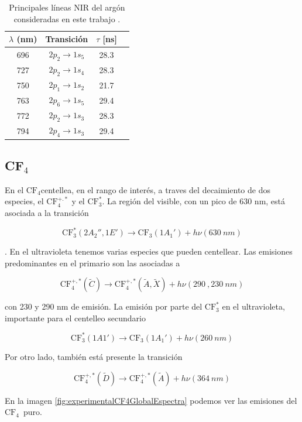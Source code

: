 \documentclass[12pt,a4paper]{article}
\newcommand{\CF}{\mathrm{CF}}
\DeclareRobustCommand{\CFt}{\ensuremath{\mathrm{CF}_4}}
\begin{document}
\begin{table}[htbp]
    \centering
    \caption{Principales líneas NIR del argón consideradas en este trabajo \cite{Wiese1989Argon}.}
    \label{tab:ArNIRlines}
    \begin{tabular}{cccc}
        \toprule
        $\lambda$ (nm) & Transición & $\tau$ [ns] \\
        \midrule
        696 & $2p_2 \rightarrow 1s_5$ & 28.3 \\
        727 & $2p_2 \rightarrow 1s_4$ & 28.3 \\
        750 & $2p_1 \rightarrow 1s_2$ & 21.7 \\
        763 & $2p_6 \rightarrow 1s_5$ & 29.4 \\
        772 & $2p_2 \rightarrow 1s_3$ & 28.3 \\
        794 & $2p_4 \rightarrow 1s_3$ & 29.4 \\
        \bottomrule
    \end{tabular}
\end{table}


\subsection{CF$_4$}

En el \CFt centellea, en el rango de interés, a traves del decaimiento de dos especies, el $\CF_4^{+.*}$ y el $\CF_3^*$. La región del visible, con un pico de 630 nm, está asociada a la transición 

$$\CF_3^*(2A_2'',1E') \rightarrow \CF_3(1A_1') + h \nu (\SI{630}{nm})$$ 

\cite{washida1983emission}. En el ultravioleta tenemos varias especies que pueden centellear. Las emisiones predominantes en el primario son las asociadas a 

$$\CF_4^{+,*} (\tilde{C}) \rightarrow  \CF_4^{+,*} (\tilde{A},\tilde{X})+ h \nu (\SI{290}{},\SI{230}{nm})$$ 

con 230 y 290 nm de emisión. La emisión por parte del $\CF_3^*$ en el ultravioleta, importante para el centelleo secundario

$$\CF_3^*(1A1') \rightarrow \CF_3(1A_1') + h \nu (\SI{260}{nm})$$ 

Por otro lado, también está presente la transición 

$$\CF_4^{+,*} (\tilde{D}) \rightarrow  \CF_4^{+,*} (\tilde{A})+ h \nu (\SI{364}{nm})$$ 

En la imagen \ref{fig:experimentalCF4GlobalEspectra} podemos ver las emisiones del \CFt \ puro.
\end{document}
